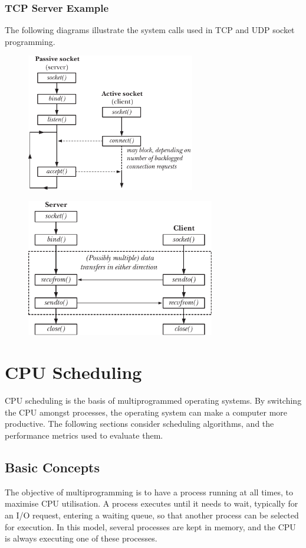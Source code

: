 \documentclass{article}
\begin{document}
\subsubsection{TCP Server Example}
The following diagrams illustrate the system calls used in TCP and UDP
socket programming.
\begin{figure}[H]
    \centering
    \includegraphics[height = 6cm]{figures/sockets_TCP.pdf}
\end{figure}
\begin{figure}[H]
    \centering
    \includegraphics[height = 6cm]{figures/sockets_UDP.pdf}
\end{figure}
\section{CPU Scheduling}
CPU scheduling is the basis of multiprogrammed operating systems. By
switching the CPU amongst processes, the operating system can make a
computer more productive. The following sections consider scheduling
algorithms, and the performance metrics used to evaluate them.
\subsection{Basic Concepts}
The objective of multiprogramming is to have a process running at all
times, to maximise CPU utilisation. A process executes until it needs
to wait, typically for an I/O request, entering a waiting queue, so
that another process can be selected for execution. In this model,
several processes are kept in memory, and the CPU is always executing
one of these processes.
\end{document}
